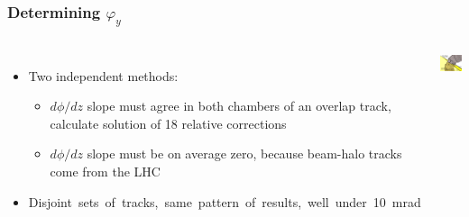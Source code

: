 \documentclass[compress]{beamer}
\begin{document}
\begin{frame}
\frametitle{Determining $\varphi_y$}
\small

\begin{columns}

\begin{itemize}
\item Two independent methods:
\begin{itemize}
\item $d\phi/dz$ slope must agree in both chambers of an overlap track, calculate solution of 18 relative corrections
\item $d\phi/dz$ slope must be on average zero, because beam-halo tracks come from the LHC
\end{itemize}
\item \mbox{Disjoint sets of tracks, same pattern of results, well under 10~mrad\hspace{-5 cm}}
\end{itemize}

\includegraphics[width=\linewidth]{track_lhc_plane_closeup.png}
\end{columns}

\vspace{-0.2 cm}
\begin{columns}
\begin{center}
\end{center}
\end{columns}
\end{frame}
\end{document}

